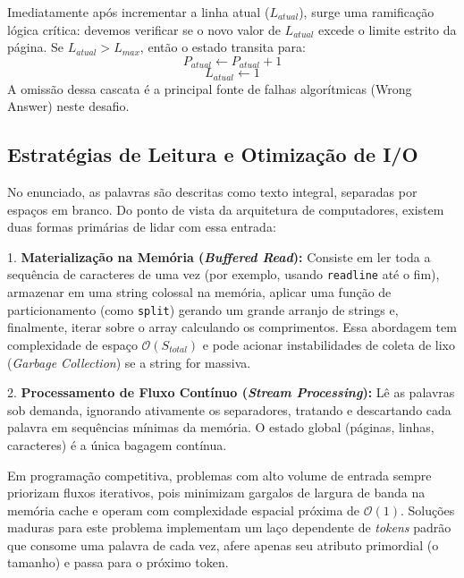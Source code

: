\documentclass[11pt]{article}
\begin{document}
\begin{warnbox}
Imediatamente após incrementar a linha atual ($L_{atual}$), surge uma ramificação lógica crítica: devemos verificar se o novo valor de $L_{atual}$ excede o limite estrito da página.
Se $L_{atual} > L_{max}$, então o estado transita para:
$$P_{atual} \leftarrow P_{atual} + 1$$
$$L_{atual} \leftarrow 1$$
A omissão dessa cascata é a principal fonte de falhas algorítmicas (Wrong Answer) neste desafio.
\end{warnbox}

\subsection{Estratégias de Leitura e Otimização de I/O}

No enunciado, as palavras são descritas como texto integral, separadas por espaços em branco. Do ponto de vista da arquitetura de computadores, existem duas formas primárias de lidar com essa entrada:

1. \textbf{Materialização na Memória (\textit{Buffered Read}):} Consiste em ler toda a sequência de caracteres de uma vez (por exemplo, usando \texttt{readline} até o fim), armazenar em uma string colossal na memória, aplicar uma função de particionamento (como \texttt{split}) gerando um grande arranjo de strings e, finalmente, iterar sobre o array calculando os comprimentos. Essa abordagem tem complexidade de espaço $\mathcal{O}(S_{total})$ e pode acionar instabilidades de coleta de lixo (\textit{Garbage Collection}) se a string for massiva.

2. \textbf{Processamento de Fluxo Contínuo (\textit{Stream Processing}):} Lê as palavras sob demanda, ignorando ativamente os separadores, tratando e descartando cada palavra em sequências mínimas da memória. O estado global (páginas, linhas, caracteres) é a única bagagem contínua. 

\begin{successbox}
Em programação competitiva, problemas com alto volume de entrada sempre priorizam fluxos iterativos, pois minimizam gargalos de largura de banda na memória cache e operam com complexidade espacial próxima de $\mathcal{O}(1)$. Soluções maduras para este problema implementam um laço dependente de \textit{tokens} padrão que consome uma palavra de cada vez, afere apenas seu atributo primordial (o tamanho) e passa para o próximo token.
\end{successbox}
\end{document}
